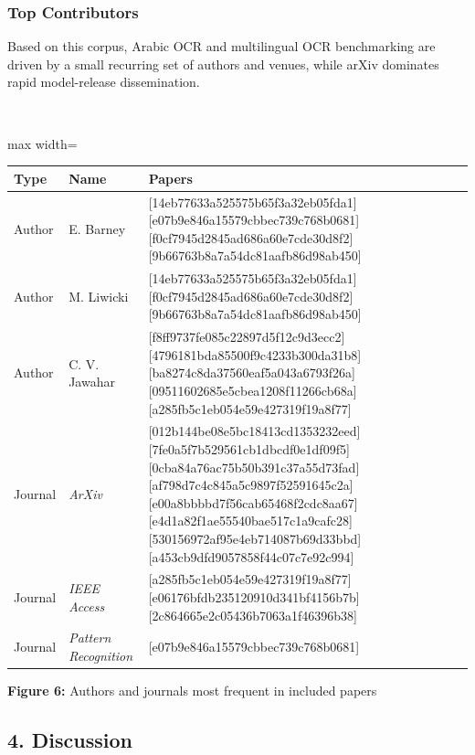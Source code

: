     
    \subsubsection*{Top Contributors}
    
    
    Based on this corpus, Arabic OCR and multilingual OCR benchmarking are driven by a small recurring set of authors and venues, while arXiv dominates rapid model-release dissemination.
    
    
    \mbox{}\\
    \begin{adjustbox}{max width=\textwidth}
    \begin{tabular}{p{5.3cm} | p{5.3cm} | p{5.3cm}}
    \hline
    Type & Name & Papers \\
    \hline
    Author & E. Barney & [14eb77633a525575b65f3a32eb05fda1][e07b9e846a15579cbbec739c768b0681][f0cf7945d2845ad686a60e7cde30d8f2][9b66763b8a7a54dc81aafb86d98ab450] \\
    Author & M. Liwicki & [14eb77633a525575b65f3a32eb05fda1][f0cf7945d2845ad686a60e7cde30d8f2][9b66763b8a7a54dc81aafb86d98ab450] \\
    Author & C. V. Jawahar & [f8ff9737fe085c22897d5f12c9d3ecc2][4796181bda85500f9c4233b300da31b8][ba8274c8da37560eaf5a043a6793f26a][09511602685e5cbea1208f11266cb68a][a285fb5c1eb054e59e427319f19a8f77] \\
    Journal & \textit{ArXiv} & [012b144be08e5bc18413cd1353232eed][7fe0a5f7b529561cb1dbcdf0e1df09f5][0cba84a76ac75b50b391c37a55d73fad][af798d7c4c845a5c9897f52591645c2a][e00a8bbbbd7f56cab65468f2cdc8aa67][e4d1a82f1ae55540bae517c1a9cafc28][530156972af95e4eb714087b69d33bbd][a453cb9dfd9057858f44c07c7e92c994] \\
    Journal & \textit{IEEE Access} & [a285fb5c1eb054e59e427319f19a8f77][e06176bfdb235120910d341bf4156b7b][2c864665e2c05436b7063a1f46396b38] \\
    Journal & \textit{Pattern Recognition} & [e07b9e846a15579cbbec739c768b0681] \\
    \hline
    \end{tabular}
    \end{adjustbox}
    
    
    \textbf{Figure 6:} Authors and journals most frequent in included papers
    
    
    \subsection*{4. Discussion}
    
